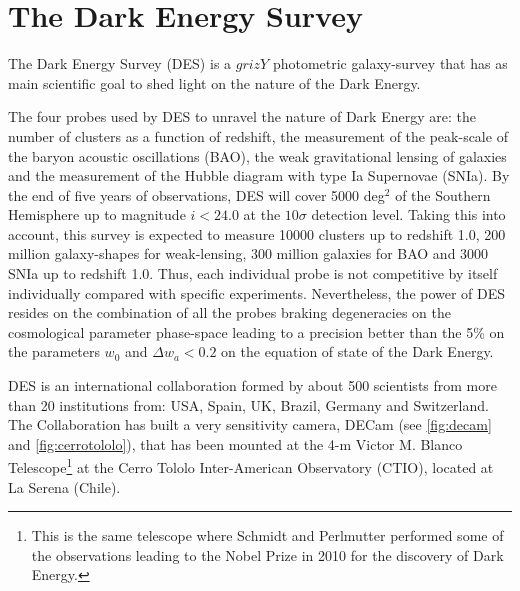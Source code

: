 \chapter{The Dark Energy Survey}
\label{ch:DES}

The Dark Energy Survey (DES) \cite{2005astro.ph.10346T} is a $grizY$ photometric galaxy-survey that has as main scientific goal to shed light on the nature of the Dark Energy.
\newline

The four probes used by DES to unravel the nature of Dark Energy are: the number of clusters as a function of redshift, the measurement of the peak-scale of the baryon acoustic oscillations (BAO), the weak gravitational lensing of galaxies and the measurement of the Hubble diagram with type Ia Supernovae (SNIa). By the end of five years of observations, DES will cover 5000 deg$^2$ of the Southern Hemisphere up to magnitude $i<24.0$ at the $10\sigma$ detection level. Taking this into account, this survey is expected to measure 10000 clusters up to redshift 1.0, 200 million galaxy-shapes for weak-lensing, 300 million galaxies for BAO and 3000 SNIa up to redshift 1.0. Thus, each individual probe is not competitive by itself individually compared with specific experiments. Nevertheless, the power of DES resides on the combination of all the probes braking degeneracies on the cosmological parameter phase-space leading to a precision better than the 5\% on the parameters $w_0$ and $\Delta w_a<0.2$ on the equation of state of the Dark Energy.
\newline

DES is an international collaboration formed by about 500 scientists from more than 20 institutions from: USA, Spain, UK, Brazil, Germany and Switzerland. The Collaboration has built a very sensitivity camera, DECam (see \autoref{fig:decam} and \autoref{fig:cerrotololo}), that has been mounted at the 4-m Victor M. Blanco Telescope\footnote{This is the same telescope where Schmidt and Perlmutter performed some of the observations leading to the Nobel Prize in 2010 for the discovery of Dark Energy.} at the Cerro Tololo Inter-American Observatory (CTIO), located at La Serena (Chile).

